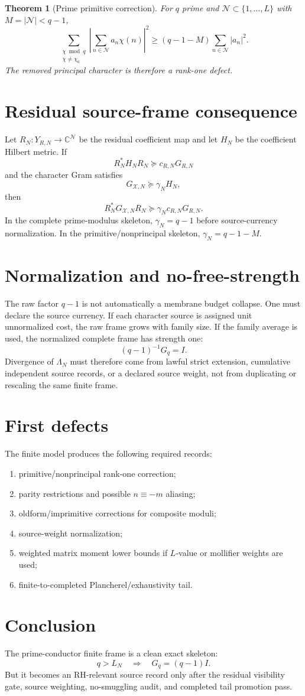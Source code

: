 \documentclass[11pt]{article}
\newtheorem{theorem}{Theorem}
\begin{document}
\begin{theorem}[Prime primitive correction]
For $q$ prime and $\mathcal N\subset\{1,
\dots,L\}$ with $M=|\mathcal N|<q-1$,
\[
\sum_{\substack{\chi\bmod q\\ \chi\ne\chi_0}}
\left|\sum_{n\in\mathcal N}a_n\chi(n)\right|^2
\ge (q-1-M)\sum_{n\in\mathcal N}|a_n|^2.
\]
The removed principal character is therefore a rank-one defect.
\end{theorem}

\section{Residual source-frame consequence}
Let $R_N:Y_{R,N}\to\mathbb C^{\mathcal N}$ be the residual coefficient map and let $H_N$ be the coefficient Hilbert metric.  If
\[
R_N^*H_NR_N\succeq c_{R,N}G_{R,N}
\]
and the character Gram satisfies
\[
G_{\mathcal X,N}\succeq \gamma_N H_N,
\]
then
\[
R_N^*G_{\mathcal X,N}R_N\succeq \gamma_N c_{R,N}G_{R,N}.
\]
In the complete prime-modulus skeleton, $\gamma_N=q-1$ before source-currency normalization.  In the primitive/nonprincipal skeleton, $\gamma_N=q-1-M$.

\section{Normalization and no-free-strength}
The raw factor $q-1$ is not automatically a membrane budget collapse.  One must declare the source currency.  If each character source is assigned unit unnormalized cost, the raw frame grows with family size.  If the family average is used, the normalized complete frame has strength one:
\[
(q-1)^{-1}G_q=I.
\]
Divergence of $\Lambda_N$ must therefore come from lawful strict extension, cumulative independent source records, or a declared source weight, not from duplicating or rescaling the same finite frame.

\section{First defects}
The finite model produces the following required records:
\begin{enumerate}[leftmargin=2em]
\item primitive/nonprincipal rank-one correction;
\item parity restrictions and possible $n\equiv -m$ aliasing;
\item oldform/imprimitive corrections for composite moduli;
\item source-weight normalization;
\item weighted matrix moment lower bounds if $L$-value or mollifier weights are used;
\item finite-to-completed Plancherel/exhaustivity tail.
\end{enumerate}

\section{Conclusion}
The prime-conductor finite frame is a clean exact skeleton:
\[
q>L_N\quad\Longrightarrow\quad G_q=(q-1)I.
\]
But it becomes an RH-relevant source record only after the residual visibility gate, source weighting, no-smuggling audit, and completed tail promotion pass.
\end{document}
